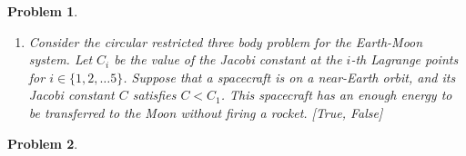 \documentclass[10pt]{article}
\theoremstyle{plain}\theorembodyfont{\normalfont}
\newtheorem{prob}{Problem}[section]
\newenvironment{subprob}%
{\renewcommand{\theenumi}{\alph{enumi}}\renewcommand{\labelenumi}{(\theenumi)}\begin{enumerate}}%
{\end{enumerate}}%
\begin{document}
\begin{prob}
\begin{subprob}
\item Consider the circular restricted three body problem for the Earth-Moon system. Let $C_i$ be the value of the Jacobi constant at the $i$-th Lagrange points for $i\in\{1,2,\ldots 5\}$. Suppose that a spacecraft is on a near-Earth orbit, and its Jacobi constant $C$ satisfies $C<C_1$. \textit{This spacecraft has an enough energy to be transferred to the Moon without firing a rocket}. [True, False] 


\end{subprob}
\end{prob}


\begin{prob}

\end{prob}





\end{document}
